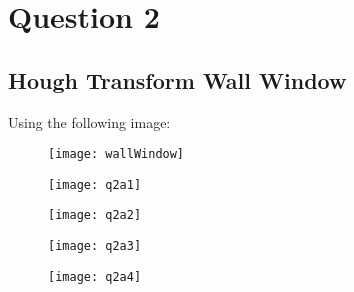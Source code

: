 \pagebreak
\section{Question 2}
	
	\subsection{Hough Transform Wall Window}
	
	\linebreak
	
	
	Using the following image:
	\begin{figure}[position = here]
		\begin{centering}
			\texttt{[image: wallWindow]}\\
			\caption[\textit{RPYAxes}]{}
		\end{centering}
	\end{figure}
	\newline
		
	\begin{figure}[position = here]
		\begin{centering}
			\texttt{[image: q2a1]}\\
			\caption[\textit{RPYAxes}]{}
		\end{centering}
	\end{figure}
	\newline	
	
	\begin{figure}[position = here]
		\begin{centering}
			\texttt{[image: q2a2]}\\
			\caption[\textit{RPYAxes}]{}
		\end{centering}
	\end{figure}
	\newline
	
	\begin{figure}[position = here]
		\begin{centering}
			\texttt{[image: q2a3]}\\
			\caption[\textit{RPYAxes}]{}
		\end{centering}
	\end{figure}
	\newline
	
	\begin{figure}[position = here]
		\begin{centering}
			\texttt{[image: q2a4]}\\
			\caption[\textit{RPYAxes}]{}
		\end{centering}
	\end{figure}
	\newline
	
